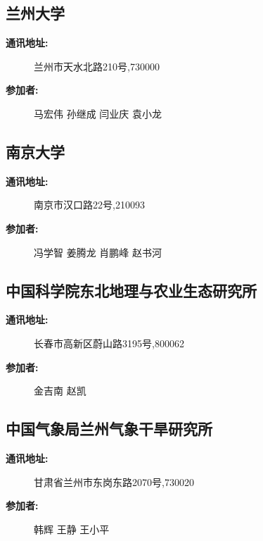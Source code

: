 \documentclass[letterpaper,10pt,english]{sphinxmanual}
\begin{document}
\subsection{兰州大学}
\label{water_partner:id15}\begin{description}
\item[{\textbf{通讯地址:}}] \leavevmode
兰州市天水北路210号,730000

\item[{\textbf{参加者:}}] \leavevmode
马宏伟
孙继成
闫业庆
袁小龙

\end{description}


\subsection{南京大学}
\label{water_partner:id16}\begin{description}
\item[{\textbf{通讯地址:}}] \leavevmode
南京市汉口路22号,210093

\item[{\textbf{参加者:}}] \leavevmode
冯学智
姜腾龙
肖鹏峰
赵书河

\end{description}


\subsection{中国科学院东北地理与农业生态研究所}
\label{water_partner:id17}\begin{description}
\item[{\textbf{通讯地址:}}] \leavevmode
长春市高新区蔚山路3195号,800062

\item[{\textbf{参加者:}}] \leavevmode
金吉南
赵凯

\end{description}


\subsection{中国气象局兰州气象干旱研究所}
\label{water_partner:id18}\begin{description}
\item[{\textbf{通讯地址:}}] \leavevmode
甘肃省兰州市东岗东路2070号,730020

\item[{\textbf{参加者:}}] \leavevmode
韩辉
王静
王小平

\end{description}
\end{document}
